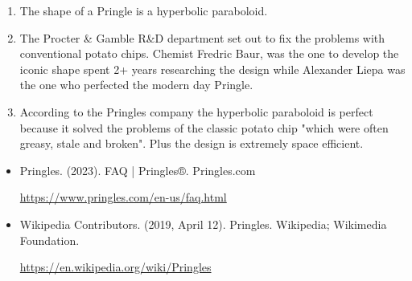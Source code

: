 \begin{enumerate}
    \item The shape of a Pringle is a hyperbolic paraboloid. 
    \item The Procter \& Gamble R\&D department set out to fix the problems with conventional potato chips. Chemist Fredric Baur, was the one to develop the iconic shape spent 2+ years researching the design while Alexander Liepa was the one who perfected the modern day Pringle.
    \item According to the Pringles company the hyperbolic paraboloid is perfect because it solved the problems of the classic potato chip "which were often greasy, stale and broken". Plus the design is extremely space efficient. 
\end{enumerate}

\begin{MLAENV}
    \begin{itemize}
        \item Pringles. (2023). FAQ | Pringles®. Pringles.com 
        
        \url{https://www.pringles.com/en-us/faq.html}
    
        \item Wikipedia Contributors. (2019, April 12). Pringles. Wikipedia; Wikimedia Foundation.
        
        \url{https://en.wikipedia.org/wiki/Pringles}
    \end{itemize}
\end{MLAENV}
